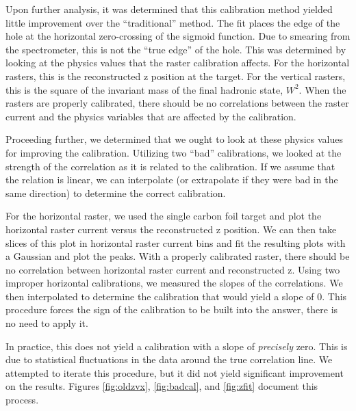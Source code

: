 Upon further analysis, it was determined that this calibration method yielded little improvement over the ``traditional'' method. The fit places the edge of the hole at the horizontal zero-crossing of the sigmoid function. Due to smearing from the spectrometer, this is not the ``true edge'' of the hole. This was determined by looking at the physics values that the raster calibration affects. For the horizontal rasters, this is the reconstructed z position at the target. For the vertical rasters, this is the square of the invariant mass of the final hadronic state, $W^2$. When the rasters are properly calibrated, there should be no correlations between the raster current and the physics variables that are affected by the calibration.

Proceeding further, we determined that we ought to look at these physics values for improving the calibration. Utilizing two ``bad'' calibrations, we looked at the strength of the correlation as it is related to the calibration. If we assume that the relation is linear, we can interpolate (or extrapolate if they were bad in the same direction) to determine the correct calibration.\cite{Rey}

For the horizontal raster, we used the single carbon foil target and plot the horizontal raster current versus the reconstructed z position. We can then take slices of this plot in horizontal raster current bins and fit the resulting plots with a Gaussian and plot the peaks. With a properly calibrated raster, there should be no correlation between horizontal raster current and reconstructed z. Using two improper horizontal calibrations, we measured the slopes of the correlations. We then interpolated to determine the calibration that would yield a slope of 0. This procedure forces the sign of the calibration to be built into the answer, there is no need to apply it.

In practice, this does not yield a calibration with a slope of \textit{precisely} zero. This is due to statistical fluctuations in the data around the true correlation line. We attempted to iterate this procedure, but it did not yield significant improvement on the results. Figures \ref{fig:oldzvx}, \ref{fig:badcal}, and \ref{fig:zfit} document this process.

